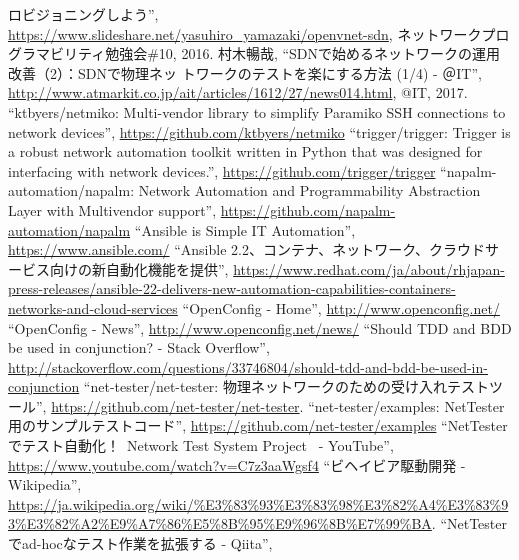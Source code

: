 \begin{thebibliography}{99}
         ロビジョニングしよう'',
         \url{https://www.slideshare.net/yasuhiro_yamazaki/openvnet-sdn},
         ネットワークプログラマビリティ勉強会\#10, 2016.
         村木暢哉, ``SDNで始めるネットワークの運用改善（2）：SDNで物理ネッ
         トワークのテストを楽にする方法 (1/4) - ＠IT'',
         \url{http://www.atmarkit.co.jp/ait/articles/1612/27/news014.html},
         @IT, 2017.
         ``ktbyers/netmiko: Multi-vendor library to simplify Paramiko SSH connections to network devices'',
         \url{https://github.com/ktbyers/netmiko}
         ``trigger/trigger: Trigger is a robust network automation toolkit written in Python that was designed for interfacing with network devices.'',
         \url{https://github.com/trigger/trigger}
         ``napalm-automation/napalm: Network Automation and Programmability Abstraction Layer with Multivendor support'',
         \url{https://github.com/napalm-automation/napalm}
         ``Ansible is Simple IT Automation'',
         \url{https://www.ansible.com/}
         ``Ansible 2.2、コンテナ、ネットワーク、クラウドサービス向けの新自動化機能を提供'',
         \url{https://www.redhat.com/ja/about/rhjapan-press-releases/ansible-22-delivers-new-automation-capabilities-containers-networks-and-cloud-services}
         ``OpenConfig - Home'',
         \url{http://www.openconfig.net/}
         ``OpenConfig - News'',
         \url{http://www.openconfig.net/news/}
         ``Should TDD and BDD be used in conjunction? - Stack Overflow'',
         \url{http://stackoverflow.com/questions/33746804/should-tdd-and-bdd-be-used-in-conjunction}
         ``net-tester/net-tester: 物理ネットワークのための受け入れテストツール'',
         \url{https://github.com/net-tester/net-tester}.
         ``net-tester/examples: NetTester用のサンプルテストコード'',
         \url{https://github.com/net-tester/examples}
         ``NetTesterでテスト自動化！~Network Test System Project~ - YouTube'',
         \url{https://www.youtube.com/watch?v=C7z3aaWgsf4}
         ``ビヘイビア駆動開発 - Wikipedia'',
         \url{https://ja.wikipedia.org/wiki/%E3%83%93%E3%83%98%E3%82%A4%E3%83%93%E3%82%A2%E9%A7%86%E5%8B%95%E9%96%8B%E7%99%BA}.
         ``NetTesterでad-hocなテスト作業を拡張する - Qiita'',

\end{thebibliography}
